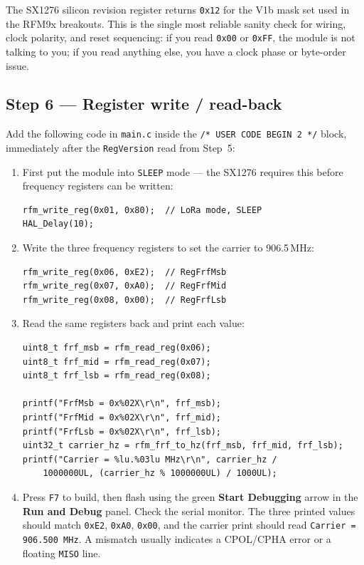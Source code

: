 \documentclass[11pt,letterpaper]{article}
\begin{document}
\begin{tcolorbox}[infobox={Why 0x12?}]
	The SX1276 silicon revision register returns \texttt{0x12} for the V1b mask set used in the RFM9x breakouts. This is the single most reliable sanity check for \SPI{} wiring, clock polarity, and reset sequencing: if you read \texttt{0x00} or \texttt{0xFF}, the module is not talking to you; if you read anything else, you have a clock phase or byte-order issue.
\end{tcolorbox}


\subsection{Step 6 --- Register write / read-back}

Add the following code in \texttt{main.c} inside the \texttt{/* USER CODE BEGIN 2 */} block, immediately after the \texttt{RegVersion} read from Step~5:

\begin{enumerate}[leftmargin=2em]
	\item First put the module into \texttt{SLEEP} mode --- the SX1276 requires this before frequency registers can be written:
\begin{verbatim}
rfm_write_reg(0x01, 0x80);  // LoRa mode, SLEEP
HAL_Delay(10);
\end{verbatim}
	\item Write the three frequency registers to set the carrier to 906.5\,MHz:
\begin{verbatim}
rfm_write_reg(0x06, 0xE2);  // RegFrfMsb
rfm_write_reg(0x07, 0xA0);  // RegFrfMid
rfm_write_reg(0x08, 0x00);  // RegFrfLsb
\end{verbatim}
	\item Read the same registers back and print each value:
\begin{verbatim}
uint8_t frf_msb = rfm_read_reg(0x06);
uint8_t frf_mid = rfm_read_reg(0x07);
uint8_t frf_lsb = rfm_read_reg(0x08);

printf("FrfMsb = 0x%02X\r\n", frf_msb);
printf("FrfMid = 0x%02X\r\n", frf_mid);
printf("FrfLsb = 0x%02X\r\n", frf_lsb);
uint32_t carrier_hz = rfm_frf_to_hz(frf_msb, frf_mid, frf_lsb);
printf("Carrier = %lu.%03lu MHz\r\n", carrier_hz / 
	1000000UL, (carrier_hz % 1000000UL) / 1000UL);
\end{verbatim}
	\item Press \texttt{F7} to build, then flash using the green \textbf{Start Debugging} arrow in the \textbf{Run and Debug} panel. Check the serial monitor. The three printed values should match \texttt{0xE2}, \texttt{0xA0}, \texttt{0x00}, and the carrier print should read \texttt{Carrier = 906.500 MHz}. A mismatch usually indicates a \mbox{CPOL}/\mbox{CPHA} error or a floating \texttt{MISO} line.
\end{enumerate}
\end{document}
